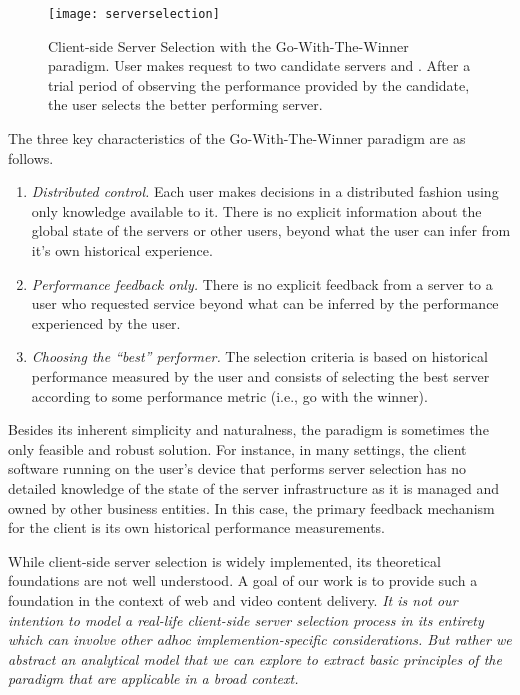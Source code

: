 \documentclass[conference]{IEEEtran}
\begin{document}
\begin{figure}[t]
\centering
\texttt{[image: serverselection]}
\caption{Client-side Server Selection with the Go-With-The-Winner paradigm. User  makes request to two candidate servers  and . After a trial period of observing the performance provided by the candidate, the user selects the better performing server.}
\label{fig:serverselection}
\end{figure}
The three key characteristics of the Go-With-The-Winner paradigm are as follows.
\begin{enumerate}
\item {\em Distributed control.} Each user makes decisions in a distributed fashion using only knowledge available to it. There is no explicit information about the global state of the servers or other users, beyond what the user can infer from it's own historical experience.
\item {\em Performance feedback only.} There is no explicit feedback from a server to a user who requested service beyond what can be inferred by the performance experienced by the user.
\item {\em Choosing the ``best'' performer.} The selection criteria is based on historical performance measured by the user and consists of selecting the best server according to some performance metric (i.e., go with the winner).
\end{enumerate}
Besides its inherent simplicity and naturalness, the paradigm is sometimes the only feasible and robust solution.  For instance, in many settings, the client software running on  the user's device that performs server selection has no detailed knowledge of the state of the server infrastructure as it is managed and owned by other business entities. In this case, the primary feedback mechanism for the client is its own historical performance measurements.

While client-side server selection is widely implemented, its theoretical foundations are not well understood. A goal of our work is to provide such a foundation in the context of web and video content delivery.  {\em It is not our intention to model a real-life client-side server selection process in its entirety which can involve other adhoc implemention-specific considerations. But rather we abstract an analytical model that we can explore to extract basic principles of the paradigm that are applicable in a broad context.}
\end{document}
